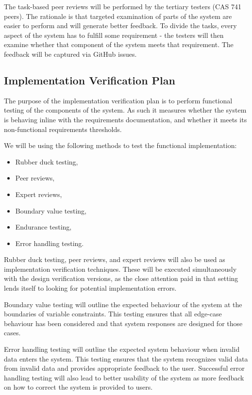 \documentclass[12pt, titlepage]{article}
\begin{document}
The task-based peer reviews will be performed by the tertiary testers (CAS 741 
peers). The rationale is that targeted examination of parts of the system are 
easier to perform and will generate better feedback. To divide the tasks, every 
aspect of the system has to fulfill some requirement - the testers will then 
examine whether that component of the system meets that requirement. The 
feedback will be captured via GitHub issues.

\subsection{Implementation Verification Plan}
The purpose of the implementation verification plan is to perform functional 
testing of the components of the system. As such it measures whether the system 
is behaving inline with the requirements documentation, and whether it meets 
its non-functional requirements thresholds.

We will be using the following methods to test the functional implementation:

\begin{itemize}
	\item Rubber duck testing,
	\item Peer reviews,
	\item Expert reviews,
	\item Boundary value testing,
	\item Endurance testing,
	\item Error handling testing.
\end{itemize}

Rubber duck testing, peer reviews, and expert reviews will also be used as 
implementation verification techniques. These will be executed simultaneously 
with the design verification versions, as the close attention paid in that 
setting lends itself to looking for potential implementation errors.

Boundary value testing will outline the expected behaviour of the system at the 
boundaries of variable constraints. This testing ensures that all edge-case 
behaviour has been considered and that system responses are designed for those 
cases.

Error handling testing will outline the expected system behaviour when invalid 
data enters the system. This testing ensures that the system recognizes valid 
data from invalid data and provides appropriate feedback to the user. 
Successful error handling testing will also lead to better usability of the 
system as more feedback on how to correct the system is provided to users.
\end{document}
